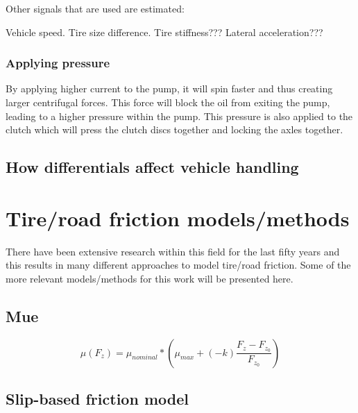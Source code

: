 Other signals that are used are estimated:

Vehicle speed.
Tire size difference.
Tire stiffness???
Lateral acceleration???



\subsubsection{Applying pressure}

By applying higher current to the pump, it will spin faster and thus creating larger centrifugal forces. This force will block the oil from exiting the pump, leading to a higher pressure within the pump. This pressure is also applied to the clutch which will press the clutch discs together and locking the axles together.

\subsection{How differentials affect vehicle handling} 

\section{Tire/road friction models/methods}

There have been extensive research within this field for the last fifty years and this results in many different approaches to model tire/road friction. Some of the more relevant models/methods for this work will be presented here.

\subsection{Mue}

\begin{equation}
	\mu(F_{z})=\mu_{nominal}*(\mu_{max} + (-k)\frac{F_{z} - F_{z_{0}}}{F_{z_{0}}})
\end{equation}

\subsection{Slip-based friction model}
